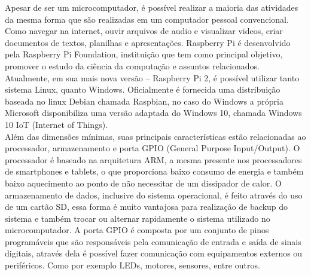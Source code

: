 Apesar de ser um microcomputador, é possível realizar a maioria das atividades da mesma forma que são realizadas em um computador pessoal convencional. Como navegar na internet, ouvir arquivos de audio e visualizar videos, criar documentos de textos, planilhas e apresentações. Raspberry Pi é desenvolvido pela Raspberry Pi Foundation, instituição que tem como principal objetivo, promover o estudo da ciência da computação e assuntos relacionados. \\
\indent Atualmente, em sua mais nova versão -- Raspberry Pi 2, é possível utilizar tanto sistema Linux, quanto Windows. Oficialmente é fornecida uma distribuição baseada no linux Debian chamada Raspbian, no caso do Windows a própria Microsoft disponibiliza uma versão adaptada do Windows 10, chamada Windows 10 IoT (Internet of Things). \\
\indent Além das dimensões mínimas, suas principais características estão relacionadas ao processador, armazenamento e porta GPIO (General Purpose Input/Output). O processador é baseado na arquitetura ARM, a mesma presente nos processadores de smartphones e tablets, o que proporciona baixo consumo de energia e também baixo aquecimento ao ponto de não necessitar de um dissipador de calor. O armazenamento de dados, inclusive do sistema operacional, é feito através do uso de um cartão SD, essa forma é muito vantajosa para realização de backup do sistema e também trocar ou alternar rapidamente o sistema utilizado no microcomputador. A porta GPIO é composta por um conjunto de pinos programáveis que são responsáveis pela comunicação de entrada e saída de sinais digitais, através dela é possível fazer comunicação com equipamentos externos ou periféricos. Como por exemplo LEDs, motores, sensores, entre outros.